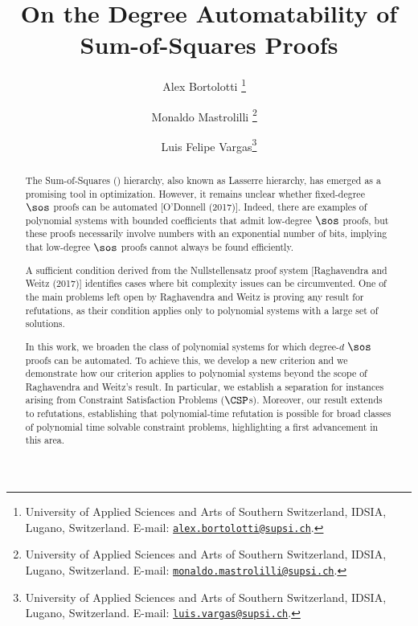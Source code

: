 \documentclass[11pt]{article}
\title{On the Degree Automatability of Sum-of-Squares Proofs} %
\date{}
\author{Alex Bortolotti \thanks{University of Applied Sciences and Arts of Southern Switzerland, IDSIA, Lugano, Switzerland. E-mail: \href{mailto:alex.bortolotti@supsi.ch}{\texttt{alex.bortolotti@supsi.ch}}.} \  \and Monaldo Mastrolilli \thanks{University of Applied Sciences and Arts of Southern Switzerland, IDSIA, Lugano, Switzerland. E-mail: \href{mailto:monaldo.mastrolilli@supsi.ch}{\texttt{monaldo.mastrolilli@supsi.ch}}.} \ \and Luis Felipe Vargas\thanks{University of Applied Sciences and Arts of Southern Switzerland, IDSIA, Lugano, Switzerland. E-mail: \href{mailto:luis.vargas@supsi.ch}{\texttt{luis.vargas@supsi.ch}}.}}
\begin{document}
\maketitle


\begin{abstract}
The Sum-of-Squares (\sos) hierarchy, also known as Lasserre hierarchy, has emerged as a promising tool in optimization.
However, it remains unclear whether fixed-degree $\sos$ proofs can be automated [O'Donnell (2017)].
Indeed, there are examples of polynomial systems with bounded coefficients that admit low-degree $\sos$ proofs, but these proofs necessarily involve numbers with an exponential number of bits, implying that low-degree $\sos$ proofs cannot always be found efficiently.
 
A sufficient condition derived from the Nullstellensatz proof system [Raghavendra and Weitz (2017)] identifies cases where bit complexity issues can be circumvented.
One of the main problems left open by Raghavendra and Weitz is proving any result for refutations, as their condition applies only to polynomial systems with a large set of solutions.

In this work, we broaden the class of polynomial systems for which degree-$d$ $\sos$ proofs can be automated. To achieve this, we develop a new criterion and we demonstrate how our criterion applies to polynomial systems beyond the scope of Raghavendra and Weitz's result. In particular, we establish a separation for instances arising from Constraint Satisfaction Problems ($\CSP$s).
Moreover, our result extends to refutations, establishing that polynomial-time refutation is possible for broad classes of polynomial time solvable constraint problems, highlighting a first advancement in this area.

\noindent{}
\end{abstract}
\newpage
{
  \hypersetup{linkcolor=black}
  \tableofcontents
}


\newpage
\end{document}
